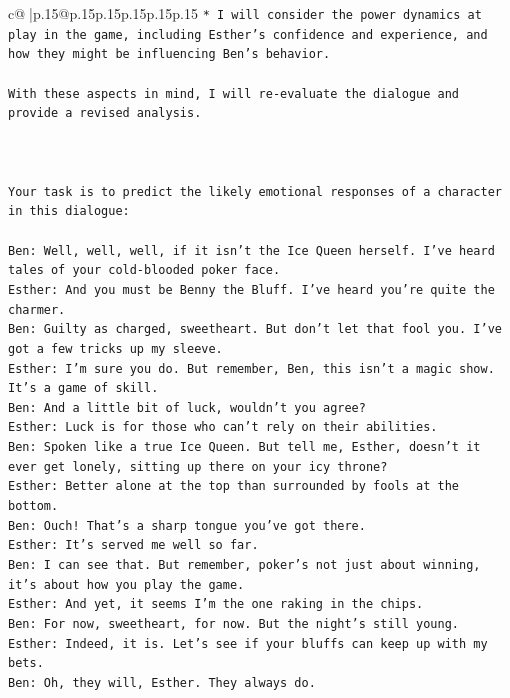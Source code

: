 \documentclass{article}
\begin{document}
{\begin{supertabular}{c@{$\;$}|p{.15\linewidth}@{}p{.15\linewidth}p{.15\linewidth}p{.15\linewidth}p{.15\linewidth}p{.15\linewidth}}
{{{\texttt{* I will consider the power dynamics at play in the game, including Esther's confidence and experience, and how they might be influencing Ben's behavior.} \\
\\ 
\texttt{With these aspects in mind, I will re{-}evaluate the dialogue and provide a revised analysis.} \\
\\ 
\\ 
\\ 
\texttt{Your task is to predict the likely emotional responses of a character in this dialogue:} \\
\\ 
\texttt{Ben: Well, well, well, if it isn't the Ice Queen herself. I've heard tales of your cold{-}blooded poker face.} \\
\texttt{Esther: And you must be Benny the Bluff. I've heard you're quite the charmer. } \\
\texttt{Ben: Guilty as charged, sweetheart. But don't let that fool you. I've got a few tricks up my sleeve.} \\
\texttt{Esther: I'm sure you do. But remember, Ben, this isn't a magic show. It's a game of skill. } \\
\texttt{Ben: And a little bit of luck, wouldn't you agree?} \\
\texttt{Esther: Luck is for those who can't rely on their abilities.} \\
\texttt{Ben: Spoken like a true Ice Queen. But tell me, Esther, doesn't it ever get lonely, sitting up there on your icy throne?} \\
\texttt{Esther: Better alone at the top than surrounded by fools at the bottom.} \\
\texttt{Ben: Ouch! That's a sharp tongue you've got there. } \\
\texttt{Esther: It's served me well so far.} \\
\texttt{Ben: I can see that. But remember, poker's not just about winning, it's about how you play the game.} \\
\texttt{Esther: And yet, it seems I'm the one raking in the chips.} \\
\texttt{Ben: For now, sweetheart, for now. But the night's still young.} \\
\texttt{Esther: Indeed, it is. Let's see if your bluffs can keep up with my bets. } \\
\texttt{Ben: Oh, they will, Esther. They always do.} \\
}}}
\end{supertabular}}
\end{document}
